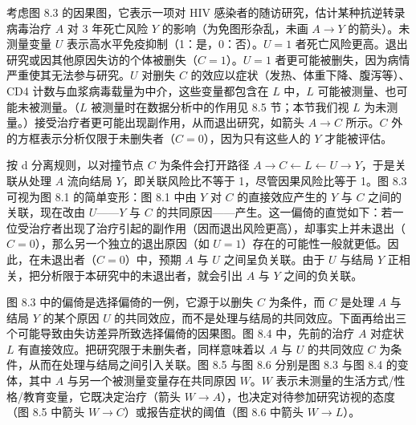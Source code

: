 考虑图 8.3 的因果图，它表示一项对 HIV 感染者的随访研究，估计某种抗逆转录病毒治疗 $A$ 对 3 年死亡风险 $Y$ 的影响（为免图形杂乱，未画 $A\to Y$ 的箭头）。未测量变量 $U$ 表示高水平免疫抑制（1：是，0：否）。$U=1$ 者死亡风险更高。退出研究或因其他原因失访的个体被删失（$C=1$）。$U=1$ 者更可能被删失，因为病情严重使其无法参与研究。$U$ 对删失 $C$ 的效应以症状（发热、体重下降、腹泻等）、CD4 计数与血浆病毒载量为中介，这些变量都包含在 $L$ 中，$L$ 可能被测量、也可能未被测量。（$L$ 被测量时在数据分析中的作用见 8.5 节；本节我们视 $L$ 为未测量。）接受治疗者更可能出现副作用，从而退出研究，如箭头 $A\to C$ 所示。$C$ 外的方框表示分析仅限于未删失者（$C=0$），因为只有这些人的 $Y$ 才能被评估。

按 d 分离规则，以对撞节点 $C$ 为条件会打开路径 $A\to C\leftarrow L\leftarrow U\to Y$，于是关联从处理 $A$ 流向结局 $Y$，即关联风险比不等于 1，尽管因果风险比等于 1。图 8.3 可视为图 8.1 的简单变形：图 8.1 中由 $Y$ 对 $C$ 的直接效应产生的 $Y$ 与 $C$ 之间的关联，现在改由 $U$——$Y$ 与 $C$ 的共同原因——产生。这一偏倚的直觉如下：若一位受治疗者出现了治疗引起的副作用（因而退出风险更高），却事实上并未退出（$C=0$），那么另一个独立的退出原因（如 $U=1$）存在的可能性一般就更低。因此，在未退出者（$C=0$）中，预期 $A$ 与 $U$ 之间呈负关联。由于 $U$ 与结局 $Y$ 正相关，把分析限于本研究中的未退出者，就会引出 $A$ 与 $Y$ 之间的负关联。

\begin{figure}[htbp]
\centering
{}
\caption{}
\label{fig:8.4}
\end{figure}

图 8.3 中的偏倚是选择偏倚的一例，它源于以删失 $C$ 为条件，而 $C$ 是处理 $A$ 与结局 $Y$ 的某个原因 $U$ 的共同效应，而不是处理与结局的共同效应。下面再给出三个可能导致由失访差异所致选择偏倚的因果图。图 8.4 中，先前的治疗 $A$ 对症状 $L$ 有直接效应。把研究限于未删失者，同样意味着以 $A$ 与 $U$ 的共同效应 $C$ 为条件，从而在处理与结局之间引入关联。图 8.5 与图 8.6 分别是图 8.3 与图 8.4 的变体，其中 $A$ 与另一个被测量变量存在共同原因 $W$。$W$ 表示未测量的生活方式/性格/教育变量，它既决定治疗（箭头 $W\to A$），也决定对待参加研究访视的态度（图 8.5 中箭头 $W\to C$）或报告症状的阈值（图 8.6 中箭头 $W\to L$）。

